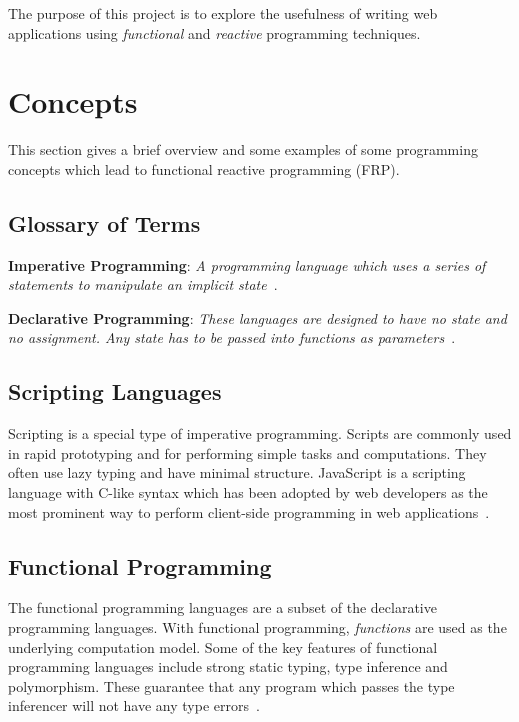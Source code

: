 The purpose of this project is to explore the usefulness of writing web applications using \emph{functional} and \emph{reactive} programming techniques.

\section{Concepts}

This section gives a brief overview and some examples of some programming concepts which lead to functional reactive programming (FRP).

\subsection{Glossary of Terms}

\textbf{Imperative Programming}: \emph{A programming language which uses a series of statements to manipulate an implicit state}~\cite{bib:prog}.

\textbf{Declarative Programming}: \emph{These languages are designed to have no state and no assignment. Any state has to be passed into functions as parameters}~\cite{bib:prog}.

\subsection{Scripting Languages}
Scripting is a special type of imperative programming. Scripts are commonly used in rapid prototyping and for performing simple tasks and computations. They often use lazy typing and have minimal structure. JavaScript is a scripting language with C-like syntax which has been adopted by web developers as the most prominent way to perform client-side programming in web applications~\cite{bib:crockford}.

\subsection{Functional Programming}
\label{lab:functional}
The functional programming languages are a subset of the declarative programming languages. With functional programming, \emph{functions} are used as the underlying computation model. Some of the key features of functional programming languages include strong static typing, type inference and polymorphism. These guarantee that any program which passes the type inferencer will not have any type errors~\cite{bib:functional_prog}.

